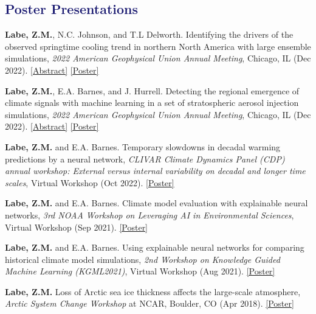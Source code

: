 \documentclass[margin,line,palatino,courier,10pt]{res}
\begin{document}
\begin{resume}
\section{\sc \textcolor{MidnightBlue}{\large{\textbf{Poster Presentations}}}}
\begin{etaremune}[leftmargin=0in,topsep=0in,parsep=0in]
\item \textbf{Labe, Z.M.}, N.C. Johnson, and T.L Delworth. Identifying the drivers of the observed springtime cooling trend in northern North America with large ensemble simulations, \textit{2022 American Geophysical Union Annual Meeting}, Chicago, IL (Dec 2022). \href{https://agu.confex.com/agu/fm22/meetingapp.cgi/Paper/1111909}{[Abstract]} \href{https://zacklabe.files.wordpress.com/2022/12/labejohnsondelworth_agu_largeensembles2022_poster.pdf}{[Poster]}
\item \textbf{Labe, Z.M.}, E.A. Barnes, and J. Hurrell. Detecting the regional emergence of climate signals with machine learning in a set of stratospheric aerosol injection simulations, \textit{2022 American Geophysical Union Annual Meeting}, Chicago, IL (Dec 2022). \href{https://agu.confex.com/agu/fm22/meetingapp.cgi/Paper/1110391}{[Abstract]} \href{https://zacklabe.files.wordpress.com/2022/12/labebarneshurrell_agu_sai2022_poster.pdf}{[Poster]}
\item \textbf{Labe, Z.M.} and E.A. Barnes. Temporary slowdowns in decadal warming predictions by a neural network, \textit{CLIVAR Climate Dynamics Panel (CDP) annual workshop: External versus internal variability on decadal and longer time scales}, Virtual Workshop (Oct 2022). \href{https://zacklabe.files.wordpress.com/2022/09/labebarnes_poster_10-2022.pdf}{[Poster]}
\item \textbf{Labe, Z.M.} and E.A. Barnes. Climate model evaluation with explainable neural networks, \textit{3rd NOAA Workshop on Leveraging AI in Environmental Sciences}, Virtual Workshop (Sep 2021). \href{https://zacklabe.files.wordpress.com/2022/08/b875c-labebarnes_noaa-aies_2021_poster.pdf}{[Poster]}
\item \textbf{Labe, Z.M.} and E.A. Barnes. Using explainable neural networks for comparing historical climate model simulations, \textit{2nd Workshop on Knowledge Guided Machine Learning (KGML2021)}, Virtual Workshop (Aug 2021). \href{https://zacklabe.files.wordpress.com/2022/08/aa648-labebarnes_kgml2021_poster_v2_final.pdf}{[Poster]}
\item \textbf{Labe, Z.M.} Loss of Arctic sea ice thickness affects the large-scale atmosphere, \textit{Arctic System Change Workshop} at NCAR, Boulder, CO (Apr 2018). \href{https://zacklabe.files.wordpress.com/2022/08/ff668-zlabe_042018_bigideaposter.pdf}{[Poster]}

\end{etaremune}
\end{resume}
\end{document}
